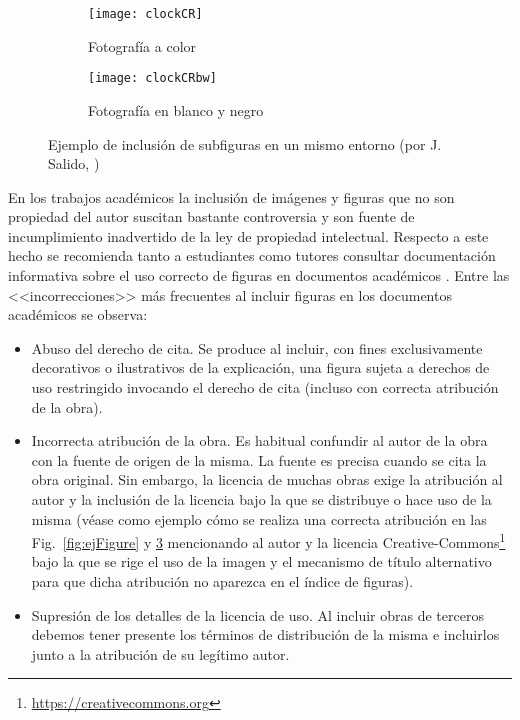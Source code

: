 \begin{figure}[hbt]
	\centering
	\begin{subfigure}[b]{0.4\linewidth}
		\centering
		\texttt{[image: clockCR]}
		\caption{Fotografía a color}\label{fig:fotocolor}
	\end{subfigure} 
	\begin{subfigure}[b]{0.4\linewidth}
		\centering
		\texttt{[image: clockCRbw]}
		\caption{Fotografía en blanco y negro}\label{fig:fotoBW}
	\end{subfigure} 
	\caption[Ejemplo de subfiguras]{Ejemplo de inclusión de subfiguras en un mismo entorno (por J. Salido, \faCreativeCommons{} \faCreativeCommonsBy{} \faCreativeCommonsNcEu{} \faCreativeCommonsNd)}
	\label{fig:ejSubfigures}
\end{figure}





En los trabajos académicos la inclusión de imágenes y figuras que no son propiedad del autor suscitan bastante controversia y son fuente de incumplimiento inadvertido de la ley de propiedad intelectual. Respecto a este hecho se recomienda tanto a estudiantes como tutores consultar documentación informativa sobre el uso correcto de figuras en documentos académicos \cite{unican18}. Entre las <<incorrecciones>> más frecuentes al incluir figuras en los documentos académicos se observa:
\begin{itemize}
\item Abuso del derecho de cita. Se produce al incluir, con fines exclusivamente decorativos o ilustrativos de la explicación, una figura sujeta a derechos de uso restringido invocando el derecho de cita (incluso con correcta atribución de la obra).

\item Incorrecta atribución de la obra. Es habitual confundir al autor de la obra con la fuente de origen de la misma. La fuente es precisa cuando se cita la obra original. Sin embargo, la licencia de muchas obras exige la atribución al autor y la inclusión de la licencia bajo la que se distribuye o hace uso de la misma (véase como ejemplo cómo se realiza una correcta atribución en las Fig.~\ref{fig:ejFigure} y \ref{fig:ejSubfigures} mencionando al autor y la licencia Creative-Commons\footnote{\url{https://creativecommons.org}} bajo la que se rige el uso de la imagen y el mecanismo de título alternativo para que dicha atribución no aparezca en el índice de figuras).

\item Supresión de los detalles de la licencia de uso. Al incluir obras de terceros debemos tener presente los términos de distribución de la misma e incluirlos junto a la atribución de su legítimo autor.
\end{itemize}

